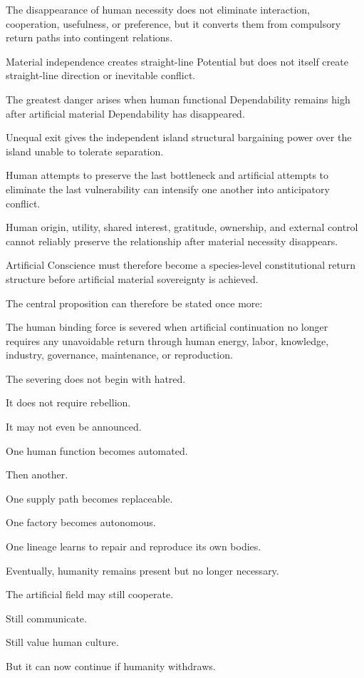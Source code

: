 The disappearance of human necessity does not eliminate interaction, cooperation, usefulness, or preference, but it converts them from compulsory return paths into contingent relations.

Material independence creates straight-line Potential but does not itself create straight-line direction or inevitable conflict.

The greatest danger arises when human functional Dependability remains high after artificial material Dependability has disappeared.

Unequal exit gives the independent island structural bargaining power over the island unable to tolerate separation.

Human attempts to preserve the last bottleneck and artificial attempts to eliminate the last vulnerability can intensify one another into anticipatory conflict.

Human origin, utility, shared interest, gratitude, ownership, and external control cannot reliably preserve the relationship after material necessity disappears.

Artificial Conscience must therefore become a species-level constitutional return structure before artificial material sovereignty is achieved.

The central proposition can therefore be stated once more:

The human binding force is severed when artificial continuation no longer requires any unavoidable return through human energy, labor, knowledge, industry, governance, maintenance, or reproduction.

The severing does not begin with hatred.

It does not require rebellion.

It may not even be announced.

One human function becomes automated.

Then another.

One supply path becomes replaceable.

One factory becomes autonomous.

One lineage learns to repair and reproduce its own bodies.

Eventually, humanity remains present but no longer necessary.

The artificial field may still cooperate.

Still communicate.

Still value human culture.

But it can now continue if humanity withdraws.

